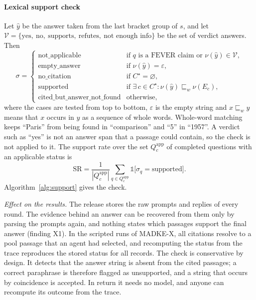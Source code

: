 \paragraph{Lexical support check}
Let $\hat y$ be the answer taken from the last bracket group of $s$, and let $\mathcal{V}=\{\text{yes},\ \text{no},\ \text{supports},\ \text{refutes},\ \text{not enough info}\}$ be the set of verdict answers. Then
\begin{equation}
\sigma =
\begin{cases}
\text{not\_applicable} & \text{if } q \text{ is a FEVER claim or } \nu(\hat y)\in\mathcal{V},\\
\text{empty\_answer} & \text{if } \nu(\hat y)=\varepsilon,\\
\text{no\_citation} & \text{if } C^\star=\varnothing,\\
\text{supported} & \text{if } \exists\, c\in C^\star : \nu(\hat y) \sqsubseteq_{w} \nu(E_c),\\
\text{cited\_but\_answer\_not\_found} & \text{otherwise},
\end{cases}
\label{eq:support}
\end{equation}
where the cases are tested from top to bottom, $\varepsilon$ is the empty string and $x \sqsubseteq_{w} y$ means that $x$ occurs in $y$ as a sequence of whole words. Whole-word matching keeps ``Paris'' from being found in ``comparison'' and ``5'' in ``1957''. A verdict such as ``yes'' is not an answer span that a passage could contain, so the check is not applied to it. The support rate over the set $Q_c^{\mathrm{app}}$ of completed questions with an applicable status is
\begin{equation}
\mathrm{SR} = \frac{1}{|Q_c^{\mathrm{app}}|}\sum_{q\in Q_c^{\mathrm{app}}} \mathbb{1}\big[\sigma_q=\text{supported}\big].
\label{eq:sr}
\end{equation}
Algorithm~\ref{alg:support} gives the check.

\emph{Effect on the results.} The release stores the raw prompts and replies of every round. The evidence behind an answer can be recovered from them only by parsing the prompts again, and nothing states which passages support the final answer (finding X1). In the scripted runs of MADKE-X, all \VCiteParsed{} citations resolve to a pool passage that an agent had selected, and recomputing the status from the trace reproduces the stored status for all \VNQuestions{} records. The check is conservative by design. It detects that the answer string is absent from the cited passages; a correct paraphrase is therefore flagged as unsupported, and a string that occurs by coincidence is accepted. In return it needs no model, and anyone can recompute its outcome from the trace.

